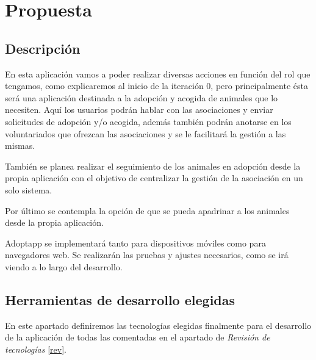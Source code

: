 \chapter{Propuesta}

\section{Descripción}
En esta aplicación vamos a poder realizar diversas acciones en función del rol que tengamos, como explicaremos al inicio de la iteración 0, pero principalmente ésta será una aplicación destinada a la adopción y acogida de animales que lo necesiten. Aquí los usuarios podrán hablar con las asociaciones y enviar solicitudes de adopción y/o acogida, además también podrán anotarse en los voluntariados que ofrezcan las asociaciones y se le facilitará la gestión a las mismas.

También se planea realizar el seguimiento de los animales en adopción desde la propia aplicación con el objetivo de centralizar la gestión de la asociación en un solo sistema.

Por último se contempla la opción de que se pueda apadrinar a los animales desde la propia aplicación.

Adoptapp se implementará tanto para dispositivos móviles como para navegadores web. Se realizarán las pruebas y ajustes necesarios, como se irá viendo a lo largo del desarrollo.

\section{Herramientas de desarrollo elegidas}
En este apartado definiremos las tecnologías elegidas finalmente para el desarrollo de la aplicación de todas las comentadas en el apartado de \textit{Revisión de tecnologías} \ref{rev}.

